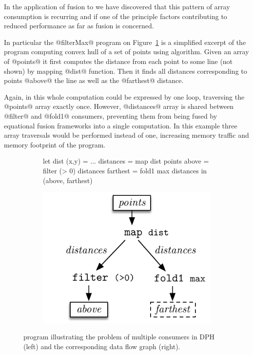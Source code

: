 \documentclass[preamble.tex]{subfiles}
\begin{document}
In the application of fusion to \DPH\idph we have discovered that this pattern of array consumption is recurring and if one of the principle factors contributing to reduced performance as far as fusion is concerned.

In particular the @filterMax@ program on Figure~\ref{fig:filterMax} is a simplified excerpt of the \DPH program computing convex hull of a set of points using \QuickHull\iqh algorithm. Given an array of @points@ it first computes the distance from each point to some line (not shown) by mapping @dist@ function. Then it finds all distances corresponding to points @above@ the line as well as the @farthest@ distance.

Again, in \C this whole computation could be expressed by one loop, traversing the @points@ array exactly once. However, @distances@ array is shared between @filter@ and @fold1@ consumers, preventing them from being fused by equational fusion frameworks into a single computation. In this example three array traversals would be performed instead of one, increasing memory traffic and memory footprint of the program.


\begin{figure}

\begin{subfigure}{.6\textwidth}%
\begin{hscode}
let dist (x,y) = ...
    distances  = map dist points
    above      = filter (> 0) distances
    farthest   = fold1 max distances
in  (above, farthest)
\end{hscode}
\end{subfigure}%
%
\begin{subfigure}{.4\textwidth}%
\includegraphics[center,scale=0.85]{img/filterMax-dataflow}%
\end{subfigure}%

\caption{ program illustrating the problem of multiple consumers in DPH (left) and the corresponding data flow graph (right).}
\label{fig:filterMax}
\end{figure}
\end{document}
